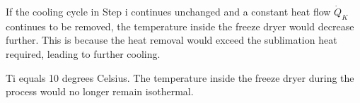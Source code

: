 If the cooling cycle in Step i continues unchanged and a constant heat flow \( \dot{Q}_K \) continues to be removed, the temperature inside the freeze dryer would decrease further. This is because the heat removal would exceed the sublimation heat required, leading to further cooling.

Ti equals 10 degrees Celsius.  
The temperature inside the freeze dryer during the process would no longer remain isothermal.
